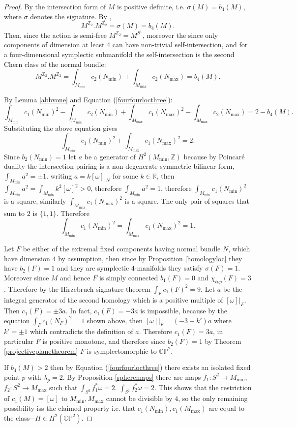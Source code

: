 \documentclass[12pt]{article}
\begin{document}
\begin{proof}
  By \cite[Theorem 3.4]{L2} the intersection form of $M$ is positive definite, i.e. $\sigma(M) = b_{4}(M)$, where $\sigma$ denotes the signature.  By \cite[Main Result]{JO}, $$M^{\mathbb{Z}_2}.M^{\mathbb{Z}_2} = \sigma(M) = b_{4}(M). $$
Then,  since the action is semi-free $M^{\mathbb{Z}_2} =M^{S^1}$, moreover the since only components of dimension at least $4$ can have non-trivial self-intersection, and for a four-dimensional symplectic submanifold the self-intersection is the second Chern class of the normal bundle: $$M^{\mathbb{Z}_2}.M^{\mathbb{Z}_2} = \int_{M_{\min}} c_{2}(N_{\min}) + \int_{M_{\max}} c_{2}(N_{\max}) = b_{4}(M).$$ 

By Lemma \ref{abbvone} and Equation (\ref{fourfourlocthree}):$$\int_{M_{\min}} c_{1}(N_{\min})^2 -\int_{M_{\min}} c_{2}(N_{\min}) + \int_{M_{\max}}c_{1}(N_{\max})^2 - \int_{M_{\max}} c_{2}(N_{\max})  = 2-b_{4}(M). $$ Substituting the above equation gives $$\int_{M_{\min}} c_{1}(N_{\min})^2 +  \int_{M_{\max}}c_{1}(N_{\max})^2   = 2.$$ Since $b_{2}(N_{\min})=1$ let $a$ be a generator of $H^{2}(M_{\min},\mathbb{Z})$ because by Poincar\'{e} duality the intersection pairing is a non-degenerate symmetric bilinear form, $\int_{M_{\min}} a^2 =\pm 1$. writing $a = k [\omega]|_{N}$ for some $k \in \mathbb{R}$, then $\int_{M_{\min}} a^2 = \int_{M_{\min} }k^2 [\omega]^2 >0$, therefore $\int_{M_{\min}} a^2=1$, therefore  $\int_{M_{\min}}   c_{1}(N_{\min})^2$ is a square, similarly $\int_{M_{\max}}  c_{1}(N_{\max})^2$ is a square. The only pair of squares that sum to $2$ is $\{1,1\}$. Therefore $$\int_{M_{\min}} c_{1}(N_{\min})^2 =  \int_{M_{\max}} c_{1}(N_{\max})^2   = 1.$$

Let $F$ be either of the extremal fixed components having normal bundle $N$, which have dimension $4$ by assumption, then since by Proposition \ref{homologyloc} they have $b_{2}(F)=1$ and they are symplectic $4$-manifolds they satisfy $\sigma(F)=1$. Moreover since $M$ and hence $F$ \cite{Li} is simply connected $b_{1}(F)=0$  and $\chi_{top}(F)=3$. Therefore by the Hirzebruch signature theorem $\int_{F} c_{1}(F)^2 = 9.$ Let $a$ be the integral generator of the second homology which is a positive multiple of $[\omega]|_{F}$. Then $c_{1}(F) = \pm 3a$. In fact, $c_{1}(F)=-3a$ is impossible, because by the equation $\int_{F} c_{1}(N_{F})^2 =1$ shown above, then $[\omega]|_{F} = (-3 + k')a$ where $k'=\pm1$ which contradicts the definition of $a$. Therefore $c_{1}(F)=3a$, in particular $F$ is positive monotone, and therefore since $b_{2}(F)=1$ by Theorem \ref{projectiveplanetheorem} $F$ is symplectomorphic to $\mathbb{CP}^2$.

If $b_{4}(M)>2$ then by Equation (\ref{fourfourlocthree}) there exists an isolated fixed point $p$ with $\lambda_{p}=2$. By Proposition \ref{spheremaps} there are maps $f_{1} : S^2 \rightarrow M_{\min}$,   $f_{2}: S^2 \rightarrow M_{\max}$ such that $\int_{S^2} f_{1}^{*}\omega = 2$. $\int_{S^2} f_{2}^{*}\omega = 2$. This shows that the restriction of $c_{1}(M) = [\omega]$ to $M_{\min},M_{\max}$ cannot be divisible by $4$, so the only remaining possibility iss the claimed property i.e. that $c_{1}(N_{\min}),c_{1}(M_{\max})$ are equal to the class$-H \in H^{2}(\mathbb{CP}^2)$.\end{proof}
\end{document}

